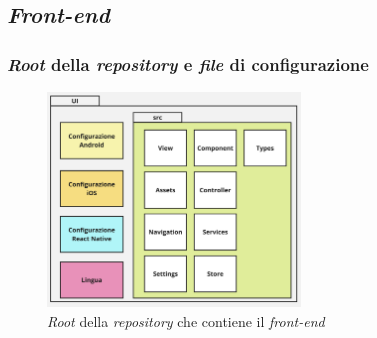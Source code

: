 \subsection{\textit{Front-end}}
\subsubsection{\textit{Root} della \textit{repository} e \textit{file} di configurazione}

\begin{figure}[H]
      \centering
      \includegraphics[width=0.6\textwidth]{img/architettura_ui.png}
      \caption{\textit{Root} della \textit{repository} che contiene il \textit{front-end}}
      \label{fig:ui architecture}
\end{figure}

